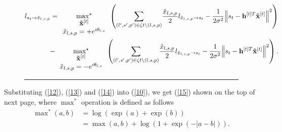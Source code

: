 \documentclass[conference]{IEEEtran}
\begin{document}
\begin{figure}[ht]
\begin{equation}
\begin{aligned}
{l_{{s_t} \to {{\tilde {x}}_{l,s,p}}}} = \mathop {{{\max }^ \star }}\limits_{\begin{array}{*{20}{c}}
{\;\;\;\;\;\;{{\bf{\tilde x}}^{[t]}}\;\;\;\;\;\;}\\
{{{\tilde {x}}_{l,s,p}} =  + {e^{i{\theta _{l,s}}}}}
\end{array}} \left( {{\sum _{(l',s',p') \in \zeta t\backslash (l,s,p)}}\frac{{{{\tilde {x}}_{l,s,p}}}}{2}{l_{{{\tilde {x}}_{l,s,p}} \to {s_t}}} - \frac{1}{{2{\sigma ^2}}}{{\left\| {{s_t} - {{\bf{\bf{h}}}^{[t]T}}{{\bf{\tilde x}}^{[t]}}} \right\|}^2}} \right) \\- \mathop {{{\max }^ \star }}\limits_{\begin{array}{*{20}{c}}
{\;\;\;\;\;\;{{\bf{\tilde x}}^{[t]}}\;\;\;\;\;\;}\\
{{{\tilde {x}}_{l,s,p}} =  - {e^{i{\theta _{l,s}}}}}
\end{array}} \left( {{\sum _{(l',s',p') \in \zeta t\backslash (l,s,p)}}\frac{{{{\tilde x}_{l,s,p}}}}{2}{l_{{{\tilde {x}}_{l,s,p}} \to {s_t}}} - \frac{1}{{2{\sigma ^2}}}{{\left\| {{s_t} - {{\bf{\bf{h}}}^{[t]T}}{{\bf{\tilde x}}^{[t]}}} \right\|}^2}} \right)\label{15}.
\end{aligned}
\end{equation}
\rule{\textwidth}{0.2mm}
\vspace{-2em}
\end{figure}
Substituting (\ref{12}), (\ref{13}) and (\ref{14}) into (\ref{10}), we get (\ref{15}) shown on the top of next page, where ${\mathop {\max }\nolimits^* }$ operation \cite{11} is defined as follows
\begin{equation}
\begin{aligned}
\mathop {\max }\nolimits^* (a,b) &= \log (\exp (a) + \exp (b)) \\&= \max(a,b) + \log(1 + \exp ( - \left| {a - b} \right|))\label{16}.
\end{aligned}
\end{equation}
\end{document}
